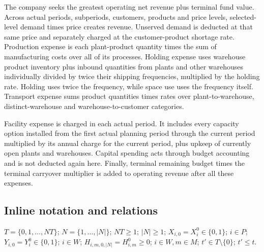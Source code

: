 \documentclass[10pt]{article}
\begin{document}
The company seeks the greatest operating net revenue plus terminal fund value. Across actual periods, subperiods, customers, products and price levels, selected-level demand times price creates revenue. Unserved demand is deducted at that same price and separately charged at the customer-product shortage rate. Production expense is each plant-product quantity times the sum of manufacturing costs over all of its processes. Holding expense uses warehouse product inventory plus inbound quantities from plants and other warehouses individually divided by twice their shipping frequencies, multiplied by the holding rate. Holding uses twice the frequency, while space use uses the frequency itself. Transport expense sums product quantities times rates over plant-to-warehouse, distinct-warehouse and warehouse-to-customer categories.

Facility expense is charged in each actual period. It includes every capacity option installed from the first actual planning period through the current period multiplied by its annual charge for the current period, plus upkeep of currently open plants and warehouses. Capital spending acts through budget accounting and is not deducted again here. Finally, terminal remaining budget times the terminal carryover multiplier is added to operating revenue after all these expenses.

\subsection*{Inline notation and relations}
$T=\{0,1,\ldots,NT\}$; $N=\{1,\ldots,|N|\}$; $NT\ge1$; $|N|\ge1$; $X_{i,0}=X_i^0\in\{0,1\}$; $i\in P$; $Y_{i,0}=Y_i^0\in\{0,1\}$; $i\in W$; $H_{i,m,0,|N|}=H^0_{i,m}\ge0$; $i\in W,m\in M$; $t'\in T\setminus\{0\}$; $t'\le t$.
\end{document}

